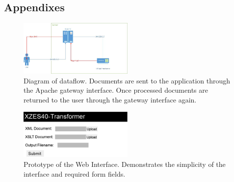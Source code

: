 \subsection{Appendixes}

% 
% 
% 
% 
% 

\begin{figure}[hp]
  \centering
  \captionsetup{justification=centering,margin=2cm}
  \includegraphics[width=0.5\textwidth]{figures/document-flow-digram}
  \caption{
    Diagram of dataflow.
    Documents are sent to the application through the Apache gateway interface.
    Once processed documents are returned to the user through the gateway interface again.
  }
\end{figure}
        
\begin{figure}[hp]
  \centering
  \captionsetup{justification=centering,margin=2cm}
  \includegraphics[width=0.5\textwidth]{figures/website-raw}
  \caption{
    Prototype of the Web Interface.
    Demonstrates the simplicity of the interface and required form fields.
  }
\end{figure}

